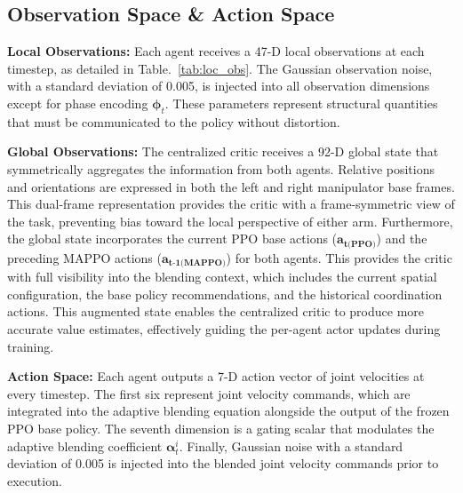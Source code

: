 \documentclass[a4paper,fleqn]{cas-dc}
\begin{document}
\subsection{Observation Space \& Action Space}
\label{observation_space_action}
\textbf{Local Observations:}
Each agent receives a 47-D local observations at each timestep, as detailed in Table.~\ref{tab:loc_obs}. The Gaussian observation noise, with a standard deviation of 0.005, is injected into all observation dimensions except for phase encoding $\mathbf{\phi}_{t}$. These parameters represent structural quantities that must be communicated to the policy without distortion. 

\textbf{Global Observations:}
The centralized critic receives a 92-D global state that symmetrically aggregates the information from both agents. Relative positions and orientations are expressed in both the left and right manipulator base frames. This dual-frame representation provides the critic with a frame-symmetric view of the task, preventing bias toward the local perspective of either arm. Furthermore, the global state incorporates the current PPO base actions ($\mathbf{a_{\text{t(PPO)}}}$) and the preceding MAPPO actions ($\mathbf{a_{\text{t-1(MAPPO)}}}$) for both agents. This provides the critic with full visibility into the blending context, which includes the current spatial configuration, the base policy recommendations, and the historical coordination actions. This augmented state enables the centralized critic to produce more accurate value estimates, effectively guiding the per-agent actor updates during training.

\textbf{Action Space:}
Each agent outputs a 7-D action vector of joint velocities at every timestep. The first six represent joint velocity commands, which are integrated into the adaptive blending equation alongside the output of the frozen PPO base policy. The seventh dimension is a gating scalar that modulates the adaptive blending coefficient $\mathbf{\alpha}^{i}_{t}$. Finally, Gaussian noise with a standard deviation of 0.005 is injected into the blended joint velocity commands prior to execution.
\end{document}
